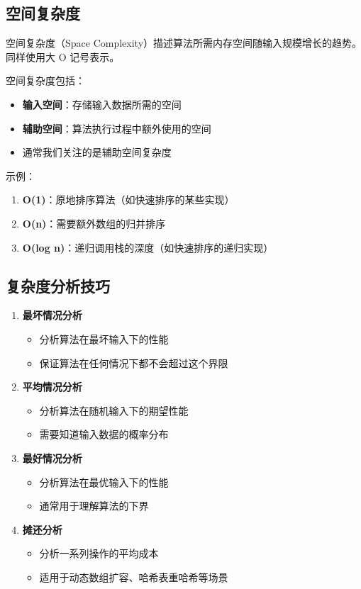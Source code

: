 \subsection{空间复杂度}


空间复杂度（Space Complexity）描述算法所需内存空间随输入规模增长的趋势。
同样使用大 O 记号表示。

空间复杂度包括：
\begin{itemize}
  \item \textbf{输入空间}：存储输入数据所需的空间
  \item \textbf{辅助空间}：算法执行过程中额外使用的空间
  \item 通常我们关注的是辅助空间复杂度
\end{itemize}

示例：
\begin{enumerate}
  \item \textbf{O(1)}：原地排序算法（如快速排序的某些实现）
  \item \textbf{O(n)}：需要额外数组的归并排序
  \item \textbf{O(log n)}：递归调用栈的深度（如快速排序的递归实现）
\end{enumerate}

\subsection{复杂度分析技巧}

\begin{enumerate}
  \item \textbf{最坏情况分析}
    \begin{itemize}
      \item 分析算法在最坏输入下的性能
      \item 保证算法在任何情况下都不会超过这个界限
    \end{itemize}

  \item \textbf{平均情况分析}
    \begin{itemize}
      \item 分析算法在随机输入下的期望性能
      \item 需要知道输入数据的概率分布
    \end{itemize}

  \item \textbf{最好情况分析}
    \begin{itemize}
      \item 分析算法在最优输入下的性能
      \item 通常用于理解算法的下界
    \end{itemize}

  \item \textbf{摊还分析}
    \begin{itemize}
      \item 分析一系列操作的平均成本
      \item 适用于动态数组扩容、哈希表重哈希等场景
    \end{itemize}
\end{enumerate}

